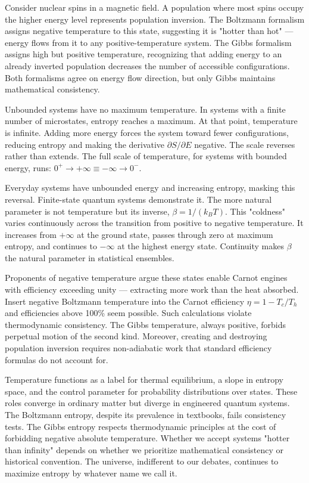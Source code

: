 Consider nuclear spins in a magnetic field. A population where most spins occupy the higher energy level represents population inversion. The Boltzmann formalism assigns negative temperature to this state, suggesting it is "hotter than hot" — energy flows from it to any positive-temperature system. The Gibbs formalism assigns high but positive temperature, recognizing that adding energy to an already inverted population decreases the number of accessible configurations. Both formalisms agree on energy flow direction, but only Gibbs maintains mathematical consistency.

Unbounded systems have no maximum temperature. In systems with a finite number of microstates, entropy reaches a maximum. At that point, temperature is infinite. Adding more energy forces the system toward fewer configurations, reducing entropy and making the derivative $ \partial S/\partial E $ negative. The scale reverses rather than extends. The full scale of temperature, for systems with bounded energy, runs: $0^+ \to +\infty \equiv -\infty \to 0^-.$

Everyday systems have unbounded energy and increasing entropy, masking this reversal. Finite-state quantum systems demonstrate it. The more natural parameter is not temperature but its inverse, $ \beta = 1/(k_B T) $. This "coldness" varies continuously across the transition from positive to negative temperature. It increases from $ +\infty $ at the ground state, passes through zero at maximum entropy, and continues to $ -\infty $ at the highest energy state. Continuity makes $ \beta $ the natural parameter in statistical ensembles.

Proponents of negative temperature argue these states enable Carnot engines with efficiency exceeding unity — extracting more work than the heat absorbed. Insert negative Boltzmann temperature into the Carnot efficiency $\eta = 1 - T_c/T_h$ and efficiencies above 100\% seem possible. Such calculations violate thermodynamic consistency. The Gibbs temperature, always positive, forbids perpetual motion of the second kind. Moreover, creating and destroying population inversion requires non-adiabatic work that standard efficiency formulas do not account for.

Temperature functions as a label for thermal equilibrium, a slope in entropy space, and the control parameter for probability distributions over states. These roles converge in ordinary matter but diverge in engineered quantum systems. The Boltzmann entropy, despite its prevalence in textbooks, fails consistency tests. The Gibbs entropy respects thermodynamic principles at the cost of forbidding negative absolute temperature. Whether we accept systems "hotter than infinity" depends on whether we prioritize mathematical consistency or historical convention. The universe, indifferent to our debates, continues to maximize entropy by whatever name we call it.

